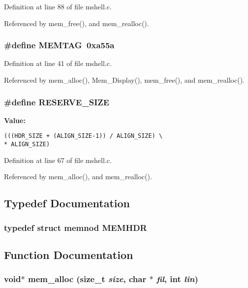 Definition at line 88 of file mshell.c.

Referenced by mem\_\-free(), and mem\_\-realloc().
\subsubsection{\setlength{\rightskip}{0pt plus 5cm}\#define MEMTAG\ 0xa55a}\label{mshell_8c_a1}




Definition at line 41 of file mshell.c.

Referenced by mem\_\-alloc(), Mem\_\-Display(), mem\_\-free(), and mem\_\-realloc().
\subsubsection{\setlength{\rightskip}{0pt plus 5cm}\#define RESERVE\_\-SIZE}\label{mshell_8c_a4}


{\bf Value:}

\footnotesize\begin{verbatim}(((HDR_SIZE + (ALIGN_SIZE-1)) / ALIGN_SIZE) \
* ALIGN_SIZE)\end{verbatim}\normalsize 


Definition at line 67 of file mshell.c.

Referenced by mem\_\-alloc(), and mem\_\-realloc().

\subsection{Typedef Documentation}
\subsubsection{\setlength{\rightskip}{0pt plus 5cm}typedef struct {\bf memnod}  MEMHDR}\label{mshell_8c_a8}




\subsection{Function Documentation}
\subsubsection{\setlength{\rightskip}{0pt plus 5cm}void$\ast$ mem\_\-alloc (size\_\-t {\em size}, char $\ast$ {\em fil}, int {\em lin})}\label{mshell_8c_a14}




